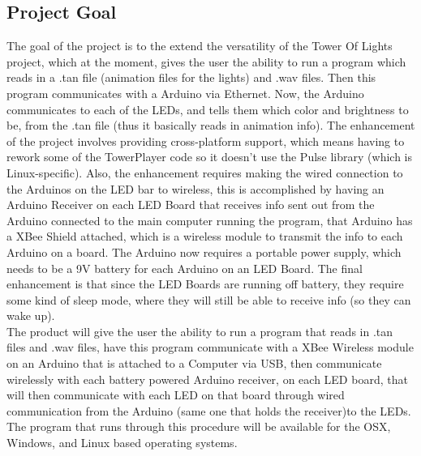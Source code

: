 \documentclass[12pt]{article}
\begin{document}
{{	\subsection{Project Goal}
	The goal of the project is to the extend the versatility of the Tower Of Lights project, which at the moment, gives the user the ability to run a program which reads in a .tan file (animation files for the lights) and .wav files. Then this
	program communicates with a Arduino via Ethernet. Now, the Arduino communicates to each of the LEDs, and tells them which
	color and brightness to be, from the .tan file (thus it basically reads in animation info). 
	The enhancement of the project involves providing cross-platform support, which means having to rework some of the TowerPlayer code so it doesn't use the Pulse library (which is Linux-specific). Also, the enhancement requires making the wired connection to the Arduinos on the LED bar to wireless, this is accomplished by having an Arduino Receiver on each LED Board that receives info sent out from the Arduino connected to the main computer running the program, that Arduino has a XBee Shield attached, which is a wireless module to transmit the info to each Arduino on a board. The Arduino now requires a portable power supply, which needs to be a 9V battery for each Arduino on an LED Board. The final enhancement is that since the LED Boards are running off battery, they require some kind of sleep mode, where they will still be able to receive info (so they can wake up).\\
	
	The product will give the user the ability to run a program that reads in .tan files and .wav files, have this program communicate with a XBee Wireless module on an Arduino that is attached to a Computer via USB, then communicate wirelessly with each battery powered Arduino receiver, on each LED board, that will then communicate with each LED on that board through wired communication from the Arduino (same one that holds the receiver)to the LEDs. The program that runs through this procedure will be available for the OSX, Windows, and Linux based operating systems.

}}
\end{document}
